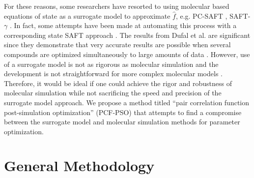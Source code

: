\documentclass[12pt]{article}
\begin{document}
For these reasons, some researchers have resorted to using molecular based equations of state as a surrogate model to approximate $\hat{f}$, e.g. PC-SAFT \cite{PC_SAFT}, SAFT-$\gamma$ \cite{GC_SAFT,Industry,Hetero,AUA_Mie}. In fact, some attempts have been made at automating this process with a corresponding state SAFT approach \cite{Corr_SAFT}. The results from Dufal et al. are significant since they demonstrate that very accurate results are possible when several compounds are optimized simultaneously to large amounts of data \cite{GC_SAFT}. However, use of a surrogate model is not as rigorous as molecular simulation and the development is not straightforward for more complex molecular models \cite{Deriv_GC_SAFT}. Therefore, it would be ideal if one could achieve the rigor and robustness of molecular simulation while not sacrificing the speed and precision of the surrogate model approach. We propose a method titled ``pair correlation function post-simulation optimization'' (PCF-PSO) that attempts to find a compromise between the surrogate model and molecular simulation methods for parameter optimization. 

 
%  
%

\section{General Methodology}
\end{document}
